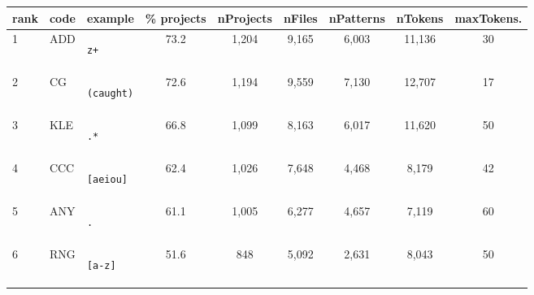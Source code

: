 \begin{table*}
\begin{center}
\begin{footnotesize}
\caption{Frequency of feature appearance in Projects, Files and Patterns, with number of tokens observed and the maximum number of tokens observed in a single pattern.}
\label{table:featureStatsOnly}
\begin{tabular}
{lllcccc  cc}
rank & code & example & \% projects & nProjects & nFiles & nPatterns & nTokens & maxTokens. \\
\toprule[0.16em]
1 & ADD & \begin{minipage}{0.5in}\begin{verbatim}z+\end{verbatim}\end{minipage} & 73.2 & 1,204 & 9,165 & 6,003 & 11,136 & 30 \\
\midrule
2 & CG & \begin{minipage}{0.5in}\begin{verbatim}(caught)\end{verbatim}\end{minipage} & 72.6 & 1,194 & 9,559 & 7,130 & 12,707 & 17 \\
\midrule
3 & KLE & \begin{minipage}{0.5in}\begin{verbatim}.*\end{verbatim}\end{minipage} & 66.8 & 1,099 & 8,163 & 6,017 & 11,620 & 50 \\
\midrule
4 & CCC & \begin{minipage}{0.5in}\begin{verbatim}[aeiou]\end{verbatim}\end{minipage} & 62.4 & 1,026 & 7,648 & 4,468 & 8,179 & 42 \\
\midrule
5 & ANY & \begin{minipage}{0.5in}\begin{verbatim}.\end{verbatim}\end{minipage} & 61.1 & 1,005 & 6,277 & 4,657 & 7,119 & 60 \\
\midrule
6 & RNG & \begin{minipage}{0.5in}\begin{verbatim}[a-z]\end{verbatim}\end{minipage} & 51.6 & 848 & 5,092 & 2,631 & 8,043 & 50 \\

\end{tabular}
\end{footnotesize}
\end{center}
\end{table*}
